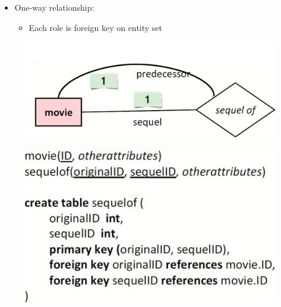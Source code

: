 \documentclass[conference]{IEEEtran}
\begin{document}
\begin{itemize}
    \item One-way relationship:
    \begin{itemize}
        \item Each role is foreign key on entity set
    \end{itemize}
\end{itemize}
\begin{figure} [h!]
    \centering
    \includegraphics[scale=0.5]{Ex32.JPG}
\end{figure}
\begin{figure} [h!]
    \centering
    \includegraphics[scale=0.5]{Ex33.JPG}
\end{figure}







\end{document}
